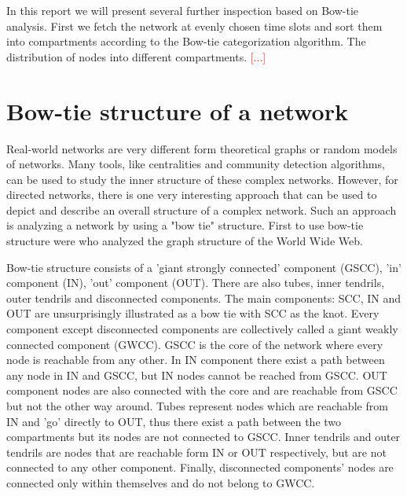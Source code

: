 \documentclass{Resources/netsci-project}
\begin{document}
In this report we will present several further inspection based on Bow-tie analysis. First we fetch the network at evenly chosen time slots and sort them into compartments according to the Bow-tie categorization algorithm. The distribution of nodes into different compartments. \textcolor{red}{[...]}

\section{Bow-tie structure of a network}

Real-world networks are very different form theoretical graphs or random models of networks. Many tools, like centralities and community detection algorithms, can be used to study the inner structure of these complex networks. However, for directed networks, there is one very interesting approach that can be used to depict and describe an overall structure of a complex network. Such an approach is analyzing a network by using a "bow tie" structure. First to use bow-tie structure were \textcite{Broder2000} who analyzed the graph structure of the World Wide Web.

Bow-tie structure consists of a 'giant strongly connected' component (GSCC), 'in' component (IN), 'out' component (OUT). There are also tubes, inner tendrils, outer tendrils and disconnected components. The main components: SCC, IN and OUT are unsurprisingly illustrated as a bow tie with SCC as the knot. Every component except disconnected components are collectively called a giant weakly connected component (GWCC). GSCC is the core of the network where every node is reachable from any other. In IN component there exist a path between any node in IN and GSCC, but IN nodes cannot be reached from GSCC. OUT component nodes are also connected with the core and are reachable from GSCC but not the other way around. Tubes represent nodes which are reachable from IN and 'go' directly to OUT, thus there exist a path between the two compartments but its nodes are not connected to GSCC. Inner tendrils and outer tendrils are nodes that are reachable form IN or OUT respectively, but are not connected to any other component. Finally, disconnected components' nodes are connected only within themselves and do not belong to GWCC. 
\end{document}
